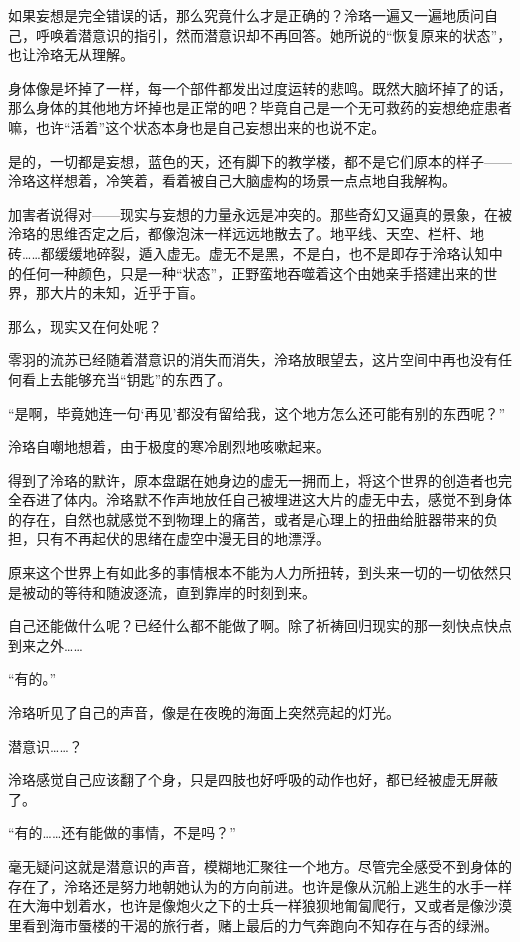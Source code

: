 \documentclass[UTF8, scheme = chinese, openany]{ctexbook}
\begin{document}
如果妄想是完全错误的话，那么究竟什么才是正确的？泠珞一遍又一遍地质问自己，呼唤着潜意识的指引，然而潜意识却不再回答。她所说的“恢复原来的状态”，也让泠珞无从理解。

身体像是坏掉了一样，每一个部件都发出过度运转的悲鸣。既然大脑坏掉了的话，那么身体的其他地方坏掉也是正常的吧？毕竟自己是一个无可救药的妄想绝症患者嘛，也许“活着”这个状态本身也是自己妄想出来的也说不定。

是的，一切都是妄想，蓝色的天，还有脚下的教学楼，都不是它们原本的样子——泠珞这样想着，冷笑着，看着被自己大脑虚构的场景一点点地自我解构。

加害者说得对——现实与妄想的力量永远是冲突的。那些奇幻又逼真的景象，在被泠珞的思维否定之后，都像泡沫一样远远地散去了。地平线、天空、栏杆、地砖……都缓缓地碎裂，遁入虚无。虚无不是黑，不是白，也不是即存于泠珞认知中的任何一种颜色，只是一种“状态”，正野蛮地吞噬着这个由她亲手搭建出来的世界，那大片的未知，近乎于盲。

那么，现实又在何处呢？

零羽的流苏已经随着潜意识的消失而消失，泠珞放眼望去，这片空间中再也没有任何看上去能够充当“钥匙”的东西了。

“是啊，毕竟她连一句‘再见’都没有留给我，这个地方怎么还可能有别的东西呢？”

泠珞自嘲地想着，由于极度的寒冷剧烈地咳嗽起来。

得到了泠珞的默许，原本盘踞在她身边的虚无一拥而上，将这个世界的创造者也完全吞进了体内。泠珞默不作声地放任自己被埋进这大片的虚无中去，感觉不到身体的存在，自然也就感觉不到物理上的痛苦，或者是心理上的扭曲给脏器带来的负担，只有不再起伏的思绪在虚空中漫无目的地漂浮。

原来这个世界上有如此多的事情根本不能为人力所扭转，到头来一切的一切依然只是被动的等待和随波逐流，直到靠岸的时刻到来。

自己还能做什么呢？已经什么都不能做了啊。除了祈祷回归现实的那一刻快点快点到来之外……

“有的。”

泠珞听见了自己的声音，像是在夜晚的海面上突然亮起的灯光。

潜意识……？

泠珞感觉自己应该翻了个身，只是四肢也好呼吸的动作也好，都已经被虚无屏蔽了。

“有的……还有能做的事情，不是吗？”

毫无疑问这就是潜意识的声音，模糊地汇聚往一个地方。尽管完全感受不到身体的存在了，泠珞还是努力地朝她认为的方向前进。也许是像从沉船上逃生的水手一样在大海中划着水，也许是像炮火之下的士兵一样狼狈地匍匐爬行，又或者是像沙漠里看到海市蜃楼的干渴的旅行者，赌上最后的力气奔跑向不知存在与否的绿洲。
\end{document}
